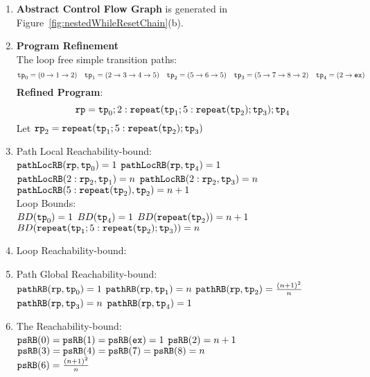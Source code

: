 \begin{enumerate}
  \item  \textbf{Abstract Control Flow Graph} is generated in Figure~\ref{fig:nestedWhileResetChain}(b).

  \item \textbf{Program Refinement}
  \\
  The loop free simple transition paths:
  \[
          \mathtt{tp}_0 = (0 \to 1 \to 2)
          \quad
          \mathtt{tp}_1 = (2 \to 3 \to 4 \to 5)
          \quad           
          \mathtt{tp}_2 = (5 \to 6 \to 5)
          \quad
          \mathtt{tp}_3 = (5 \to 7 \to 8 \to 2)
          \quad
          \mathtt{tp}_4 = (2 \to \mathtt{ex})
      \]
  \textbf{Refined Program}:
  \[
  \mathtt{rp} = \mathtt{tp}_0 ; 2: \mathtt{repeat}(\mathtt{tp}_1; 5: \mathtt{repeat}(\mathtt{tp}_2); \mathtt{tp}_3); \mathtt{tp}_4
  \]
Let $\mathtt{rp}_2 = \mathtt{repeat}(\mathtt{tp}_1; 5: \mathtt{repeat}(\mathtt{tp}_2); \mathtt{tp}_3)$
\item {Path Local Reachability-bound}:
\\
$\mathtt{pathLocRB}(\mathtt{rp}, \mathtt{tp}_0) = 1$ \quad
$\mathtt{pathLocRB}(\mathtt{rp}, \mathtt{tp}_4) = 1$ \\
$\mathtt{pathLocRB}(2: \mathtt{rp}_2, \mathtt{tp}_1) = n$ \quad
$\mathtt{pathLocRB}(2: \mathtt{rp}_2, \mathtt{tp}_3) = n$ \\
$\mathtt{pathLocRB}(5: \mathtt{repeat}(\mathtt{tp}_2), \mathtt{tp}_2) = n + 1$
%
\\
Loop Bounds:
\\
$BD(\mathtt{tp}_0) = 1$
\quad
$BD(\mathtt{tp}_4) = 1$
\quad
$BD(\mathtt{repeat}(\mathtt{tp}_2)) = n + 1 $
\\
$BD(\mathtt{repeat}(\mathtt{tp}_1; 5: \mathtt{repeat}(\mathtt{tp}_2); \mathtt{tp}_3)) = n $
%
\item Loop Reachability-bound:
\\
%
%
\item Path Global Reachability-bound:
\\
$\mathtt{pathRB}(\mathtt{rp}, \mathtt{tp}_0) = 1$ \quad
$\mathtt{pathRB}(\mathtt{rp}, \mathtt{tp}_1) = n$ \quad
$\mathtt{pathRB}(\mathtt{rp}, \mathtt{tp}_2) = \frac{(n + 1)^2}{n}$ \\
$\mathtt{pathRB}(\mathtt{rp}, \mathtt{tp}_3) = n$ \quad
$\mathtt{pathRB}(\mathtt{rp}, \mathtt{tp}_4) = 1$
%
\item The Reachability-bound:
\\
$\mathtt{psRB}(0) = \mathtt{psRB}(1) = \mathtt{psRB}(\mathtt{ex}) = 1$ \quad
$\mathtt{psRB}(2) = n + 1$ \\
$\mathtt{psRB}(3) = \mathtt{psRB}(4) =\mathtt{psRB}(7) = \mathtt{psRB}(8) = n$ \quad \\
$\mathtt{psRB}(6) = \frac{(n + 1)^2}{n} $ \quad
{}
\end{enumerate}